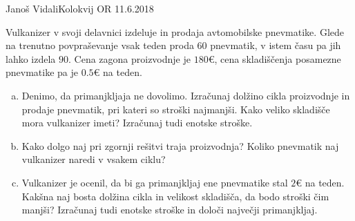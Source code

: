 \begin{naloga}{Janoš Vidali}{Kolokvij OR 11.6.2018}
\begin{vprasanje}
Vulkanizer v svoji delavnici izdeluje in prodaja avtomobilske pnevmatike.
Glede na trenutno povpraševanje vsak teden proda $60$ pnevmatik,
v istem času pa jih lahko izdela $90$.
Cena zagona proizvodnje je $180 €$,
cena skladiščenja posamezne pnevmatike pa je $0.5 €$ na teden.

\begin{enumerate}[(a)]
\item Denimo, da primanjkljaja ne dovolimo.
Izračunaj dolžino cikla pro\-iz\-vod\-nje in prodaje pnevmatik,
pri kateri so stroški najmanjši.
Kako veliko skladišče mora vulkanizer imeti?
Izračunaj tudi enotske stroške.

\item Kako dolgo naj pri zgornji rešitvi traja proizvodnja?
Koliko pnevmatik naj vulkanizer naredi v vsakem ciklu?

\item Vulkanizer je ocenil,
da bi ga primanjkljaj ene pnevmatike stal $2 €$ na teden.
Kakšna naj bosta dolžina cikla in velikost skladišča,
da bodo stroški čim manjši?
Izračunaj tudi enotske stroške in določi največji primanjkljaj.
\end{enumerate}
\end{vprasanje}
\begin{odgovor}
\end{odgovor}
\end{naloga}
